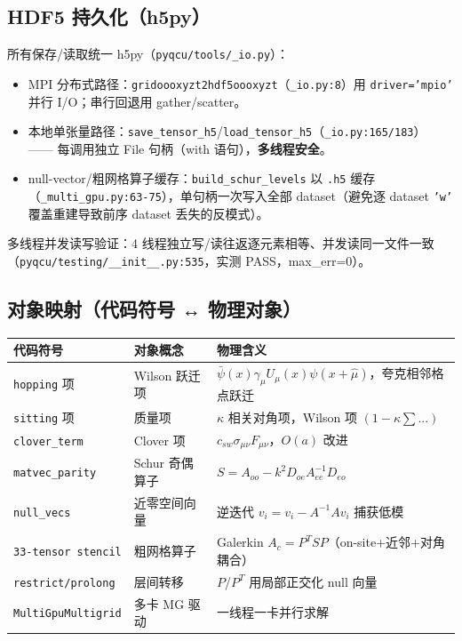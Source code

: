 \documentclass[UTF8]{ctexart}
\begin{document}
\subsection{HDF5 持久化（h5py）}

所有保存/读取统一 h5py（\texttt{pyqcu/tools/\_io.py}）：
\begin{itemize}
  \item MPI 分布式路径：\texttt{gridoooxyzt2hdf5oooxyzt}（\texttt{\_io.py:8}）用
        \texttt{driver='mpio'} 并行 I/O；串行回退用 gather/scatter。
  \item 本地单张量路径：\texttt{save\_tensor\_h5}/\texttt{load\_tensor\_h5}（\texttt{\_io.py:165/183}）
        —— 每调用独立 File 句柄（with 语句），\textbf{多线程安全}。
  \item null-vector/粗网格算子缓存：\texttt{build\_schur\_levels} 以 \texttt{.h5} 缓存
        （\texttt{\_multi\_gpu.py:63-75}），单句柄一次写入全部 dataset（避免逐 dataset
        \texttt{'w'} 覆盖重建导致前序 dataset 丢失的反模式）。
\end{itemize}
多线程并发读写验证：4 线程独立写/读往返逐元素相等、并发读同一文件一致
（\texttt{pyqcu/testing/\_\_init\_\_.py:535}，实测 PASS，max\_err=0）。

\subsection{对象映射（代码符号 ↔ 物理对象）}

\begin{center}
\begin{tabular}{lll}
\toprule
代码符号 & 对象概念 & 物理含义 \\
\midrule
\texttt{hopping} 项 & Wilson 跃迁项 & $\bar\psi(x)\gamma_\mu U_\mu(x)\psi(x+\hat\mu)$，夸克相邻格点跃迁 \\
\texttt{sitting} 项 & 质量项 & $\kappa$ 相关对角项，Wilson 项 $(1-\kappa\sum...)$ \\
\texttt{clover\_term} & Clover 项 & $c_{sw}\sigma_{\mu\nu}F_{\mu\nu}$，$O(a)$ 改进 \\
\texttt{matvec\_parity} & Schur 奇偶算子 & $S = A_{oo} - k^2 D_{oe} A_{ee}^{-1} D_{eo}$ \\
\texttt{null\_vecs} & 近零空间向量 & 逆迭代 $v_i = v_i - A^{-1} A v_i$ 捕获低模 \\
\texttt{33-tensor stencil} & 粗网格算子 & Galerkin $A_c = P^T S P$（on-site+近邻+对角耦合）\\
\texttt{restrict/prolong} & 层间转移 & $P$/$P^T$ 用局部正交化 null 向量 \\
\texttt{MultiGpuMultigrid} & 多卡 MG 驱动 & 一线程一卡并行求解 \\
\bottomrule
\end{tabular}
\end{center}
\end{document}
